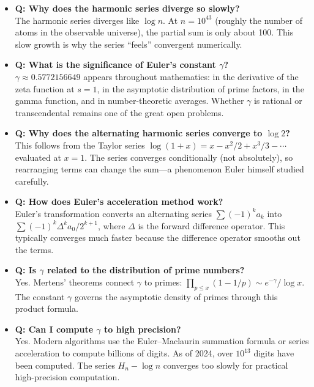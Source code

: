 \begin{itemize}
\item \textbf{Q: Why does the harmonic series diverge so slowly?} \\
The harmonic series diverges like $\log n$. At $n = 10^{43}$ (roughly the number of atoms in the observable universe), the partial sum is only about 100. This slow growth is why the series ``feels'' convergent numerically.

\item \textbf{Q: What is the significance of Euler's constant $\gamma$?} \\
$\gamma \approx 0.5772156649$ appears throughout mathematics: in the derivative of the zeta function at $s=1$, in the asymptotic distribution of prime factors, in the gamma function, and in number-theoretic averages. Whether $\gamma$ is rational or transcendental remains one of the great open problems.

\item \textbf{Q: Why does the alternating harmonic series converge to $\log 2$?} \\
This follows from the Taylor series $\log(1+x) = x - x^2/2 + x^3/3 - \cdots$ evaluated at $x = 1$. The series converges conditionally (not absolutely), so rearranging terms can change the sum---a phenomenon Euler himself studied carefully.

\item \textbf{Q: How does Euler's acceleration method work?} \\
Euler's transformation converts an alternating series $\sum (-1)^k a_k$ into $\sum (-1)^k \Delta^k a_0 / 2^{k+1}$, where $\Delta$ is the forward difference operator. This typically converges much faster because the difference operator smooths out the terms.

\item \textbf{Q: Is $\gamma$ related to the distribution of prime numbers?} \\
Yes. Mertens' theorems connect $\gamma$ to primes: $\prod_{p \le x} (1 - 1/p) \sim e^{-\gamma}/\log x$. The constant $\gamma$ governs the asymptotic density of primes through this product formula.

\item \textbf{Q: Can I compute $\gamma$ to high precision?} \\
Yes. Modern algorithms use the Euler--Maclaurin summation formula or series acceleration to compute billions of digits. As of 2024, over $10^{13}$ digits have been computed. The series $H_n - \log n$ converges too slowly for practical high-precision computation.


\end{itemize}
